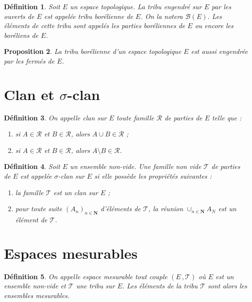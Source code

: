 \documentclass{scrreport}
\theoremstyle{def}
\newtheorem{definition}{Définition}
\theoremstyle{thm}
\theoremstyle{prop}
\newtheorem{proposition}[definition]{Proposition}
\theoremstyle{rem}
\numberwithin{definition}{section}
\numberwithin{lemma}{section}
\numberwithin{proposition}{section}
\numberwithin{theorem}{section}
\numberwithin{corol}{section}
\numberwithin{notation}{section}
\numberwithin{example}{section}
\numberwithin{exercise}{section}
\numberwithin{remark}{section}
\newcommand{\N}{\mathbf{N}}
\newcommand{\scrB}{\mathscr{B}}
\newcommand{\scrR}{\mathscr{R}}
\newcommand{\scrT}{\mathscr{T}}
\begin{document}
\begin{definition}\label{def1:2:7}
	Soit \(E\) un espace topologique. La tribu engendré sur \(E\) par les ouverts de \(E\) est appelée tribu borélienne de \(E\). On la notera \(\scrB(E)\). Les éléments de cette tribu sont appelés les parties boréliennes de \(E\) ou encore les boréliens de \(E\).
\end{definition}

\begin{proposition}\label{prop1:2:8}
	La tribu borélienne d'un espace topologique \(E\) est aussi engendrée par les fermés de \(E\).
\end{proposition}

\section{Clan et \(\sigma\)-clan}

\begin{definition}\label{def:1:3:1}
	On appelle clan sur \(E\) toute famille \(\scrR\) de parties de \(E\) telle que :
	\begin{enumerate}
		\item si \(A \in \scrR\) et \(B \in \scrR\), alors \(A \cup B \in \scrR\) ;
		\item si \(A \in \scrR\) et \(B \in \scrR\), alors \(A \setminus B \in \scrR\).
	\end{enumerate}
\end{definition}

\begin{definition}\label{def1:3:2}
	Soit \(E\) un ensemble non-vide. Une famille non vide \(\scrT\) de parties de \(E\) est appelée \(\sigma\)-clan sur \(E\) si elle possède les propriétés suivantes :
	\begin{enumerate}
		\item la famille \(\scrT\) est un clan sur \(E\) ;
		\item pour toute suite \({(A_n)}_{n \in \N}\) d'éléments de \(\scrT\), la réunion \(\cup_{n \in \N} A_N\) est un élément de \(\scrT\).
	\end{enumerate}
\end{definition}

\section{Espaces mesurables}

\begin{definition}\label{def1:4:1}
	On appelle espace mesurable tout couple \((E\,, \scrT)\) où \(E\) est un ensemble non-vide et \(\scrT\) une tribu sur \(E\). Les éléments de la tribu \(\scrT\) sont alors les ensembles mesurables.
\end{definition}
\end{document}

